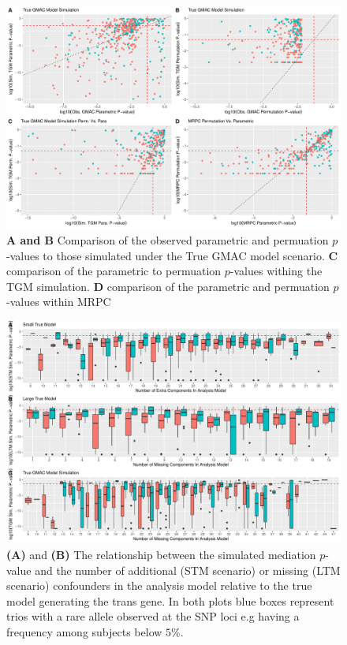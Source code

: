 \documentclass[
]{article}
\begin{document}
\begin{figure}
\centering
\includegraphics{GMACwriteup_files/figure-latex/unnamed-chunk-7-1.pdf}
\caption{\textbf{A and B} Comparison of the observed parametric and
permuation \(p\)-values to those simulated under the True GMAC model
scenario. \textbf{C} comparison of the parametric to permuation
\(p\)-values withing the TGM simulation. \textbf{D} comparison of the
parametric and permuation \(p\)-values within MRPC}
\end{figure}

\begin{figure}
\centering
\includegraphics{GMACwriteup_files/figure-latex/unnamed-chunk-8-1.pdf}
\caption{\textbf{(A)} and \textbf{(B)} The relationship between the
simulated mediation \(p\)-value and the number of additional (STM
scenario) or missing (LTM scenario) confounders in the analysis model
relative to the true model generating the trans gene. In both plots blue
boxes represent trios with a rare allele observed at the SNP loci e.g
having a frequency among subjects below \(5\%\).}
\end{figure}
\end{document}
